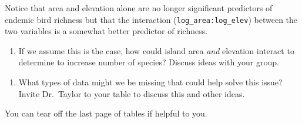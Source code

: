 \documentclass[11pt]{article}
\newcommand{\bigSpace}{\vspace{4\baselineskip}}
\begin{document}
Notice that area and elevation alone are no longer significant predictors of endemic bird richness but that the interaction (\texttt{log\_area:log\_elev}) between the two variables is a somewhat better predictor of richness.


\begin{enumerate}[resume]
\item If we assume this is the case, how could island area \emph{and} elevation interact to determine to increase number of species? Discuss ideas with your group.

\bigSpace 

\end{enumerate}


\begin{enumerate}[resume]
\item What types of data might we be missing that could help solve this issue? Invite Dr.~Taylor to your table to discuss this and other ideas.
\end{enumerate}

\newpage

\vspace*{\fill}

\hspace*{\fill} You can tear off the last page of tables if helpful to you. \hspace*{\fill}

\vspace*{\fill}


\newpage

\thispagestyle{empty}
\end{document}

